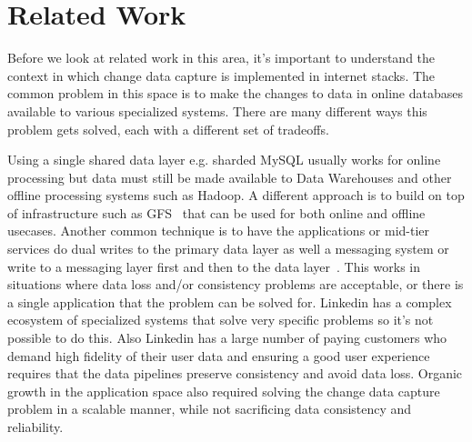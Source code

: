\section{Related Work}

Before we look at related work in this area, it's important to understand the context in which change data capture is implemented in internet stacks. The common problem in this space is to make the changes to data in online databases available to various specialized systems. There are many different ways this problem gets solved, each with a different set of tradeoffs.

Using a single shared data layer e.g. sharded MySQL usually works for online processing but data must still be made available to Data Warehouses and other offline processing systems such as Hadoop. A different approach is to build on top of infrastructure such as GFS~\cite{gfs} that can be used for both online and offline usecases.
Another common technique is to have the applications or mid-tier services do dual writes to the primary data layer as well a messaging system or write to a messaging layer first and then to the data layer~\cite{gizzard}. This works in situations where data loss and/or consistency problems are acceptable, or there is a single application that the problem can be solved for. Linkedin has a complex ecosystem of specialized systems that solve very specific problems so it's not possible to do this. Also Linkedin has a large number of paying customers who demand high fidelity of their user data and ensuring a good user experience requires that the data pipelines preserve consistency and avoid data loss. Organic growth in the application space also required solving the change data capture problem in a scalable manner, while not sacrificing data consistency and reliability.

